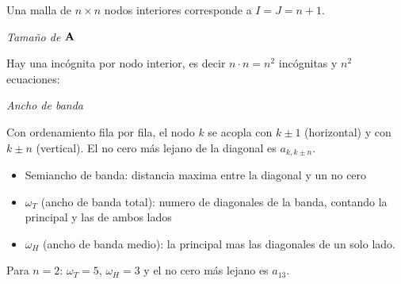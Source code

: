 
Una malla de $n\times n$ nodos interiores corresponde a $I = J = n+1$.

\textit{Tamaño de $\mathbf{A}$}

Hay una incógnita por nodo interior, es decir $n\cdot n = n^2$ incógnitas y $n^2$ ecuaciones:

\textit{Ancho de banda}

Con ordenamiento fila por fila, el nodo $k$ se acopla con $k\pm1$ (horizontal) y con $k\pm n$ (vertical). El no cero más lejano de la diagonal es $a_{k,k\pm n}$.

\begin{itemize}
	\item Semiancho de banda: distancia maxima entre la diagonal y un no cero
	\item $\omega_T$ (ancho de banda total): numero de diagonales de la banda, contando la principal y las de ambos lados
	\item $\omega_H$ (ancho de banda medio): la principal mas las diagonales de un solo lado.
\end{itemize}
Para $n = 2$: $\omega_T = 5$, $\omega_H = 3$ y el no cero más lejano es $a_{13}$.